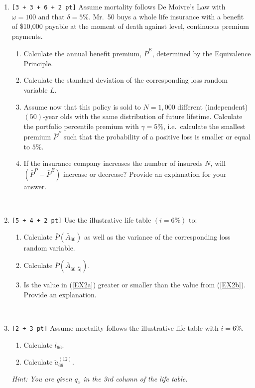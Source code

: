 \documentclass[11pt,fleqn,oneside]{book}
\begin{document}
\begin{enumerate}

\item {\tt [3 + 3 + 6 + 2 pt]}  Assume mortality follows De Moivre's Law with $\omega = 100$ and that $\delta = 5\%$. Mr.\ 50 buys a whole life insurance with a benefit of \$10,000 payable at the moment of death against level, continuous premium payments.
\begin{enumerate}
\item Calculate the annual benefit premium, $\bar{P}^E$, determined by the Equivalence Principle.
\item Calculate the standard deviation of the corresponding loss random variable $L$.
\item Assume now that this policy is sold to $N=1,000$ different (independent) $(50)$-year olds with the same distribution of future lifetime. Calculate the portfolio percentile premium with $\gamma=5\%$, i.e.\ calculate the smallest premium $\bar{P}^P$  such that the probability of a positive loss is smaller or equal to $5\%$.
\item If the insurance company increases the number of insureds $N$, will $\left(\bar{P}^P - \bar{P}^E \right)$ increase or decrease? Provide an explanation for your answer.
\end{enumerate}


 
\newpage
$\;$
\newpage

\item {\tt [5 + 4 + 2 pt]} Use the illustrative life table $(i=6\%)$ to:
\begin{enumerate}
\item \label{EX2a} Calculate $\bar{P}\left(\bar{A}_{60}\right)$ as well as the variance of the corresponding loss random variable.
\item \label{EX2b} Calculate $\bar{P}(\bar{A}_{60:\overline{5}|})$.
\item Is the value in (\ref{EX2a}) greater or smaller than the value from (\ref{EX2b}). Provide an explanation.
\end{enumerate}

\newpage
$\;$
\newpage

\item {\tt [2 + 3 pt]} Assume mortality follows the illustrative life table with $i=6\%$.
\begin{enumerate}
\item Calculate $l_{66}$.
\item Calculate $\ddot{a}_{66}^{(12)}$.
\end{enumerate}
{\small \it Hint: You are given $q_x$ in the 3rd column of the life table.}


\end{enumerate}
\end{document}
